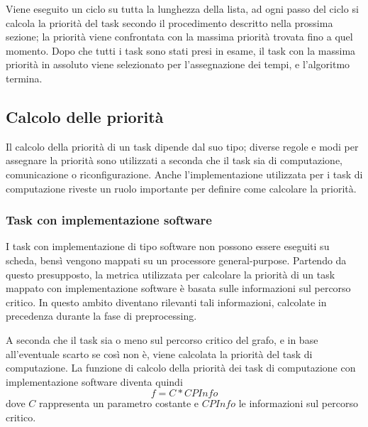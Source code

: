 Viene eseguito un ciclo su tutta la lunghezza della lista, ad ogni passo del 
ciclo si calcola la priorità del task secondo il procedimento descritto nella 
prossima sezione; la priorità viene confrontata con la massima priorità trovata 
fino a quel momento. Dopo che tutti i task sono stati presi in esame, il task 
con la massima priorità in assoluto viene selezionato per l'assegnazione dei 
tempi, e l'algoritmo termina.


\subsection{Calcolo delle priorità}
Il calcolo della priorità di un task dipende dal suo tipo; diverse regole e 
modi per assegnare la priorità sono utilizzati a seconda che il task sia di 
computazione, comunicazione o riconfigurazione. Anche l'implementazione 
utilizzata per i task di computazione riveste un ruolo importante per definire 
come calcolare la priorità.

\subsubsection{Task con implementazione software}
I task con implementazione di tipo software non possono essere eseguiti su 
scheda, bensì vengono mappati su un processore general-purpose. Partendo da 
questo presupposto, la metrica utilizzata per calcolare la priorità di un task 
mappato con implementazione software è basata sulle informazioni sul percorso 
critico. In questo ambito diventano rilevanti tali informazioni, calcolate 
in precedenza durante la fase di preprocessing.

A seconda che il task sia o meno sul percorso critico del grafo, e in 
base all'eventuale scarto se così non è, viene calcolata la priorità del task 
di computazione. La funzione di calcolo della priorità dei task di computazione 
con implementazione software diventa quindi
\begin{equation} \label{eq:softwarePriority}
 f=C*CPInfo
\end{equation}
dove $C$ rappresenta un parametro costante e $CPInfo$ le informazioni sul 
percorso critico.


